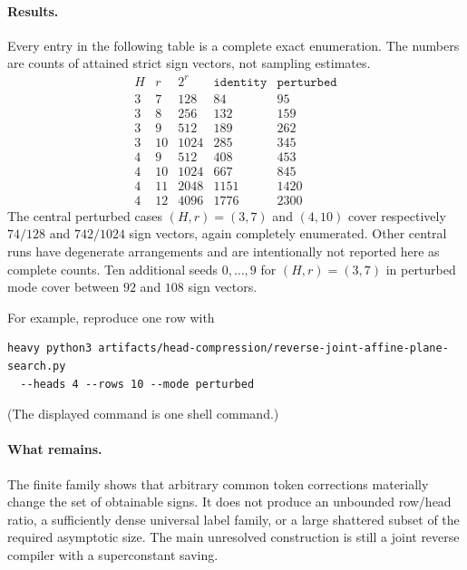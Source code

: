 \documentclass[11pt]{article}
\begin{document}
\paragraph{Results.}
Every entry in the following table is a complete exact enumeration.  The
numbers are counts of attained strict sign vectors, not sampling estimates.
\[
\begin{array}{c|r|r|r|r}
 H&r&2^r&\texttt{identity}&\texttt{perturbed}\\\hline
 3&7&128&84&95\\
 3&8&256&132&159\\
 3&9&512&189&262\\
 3&10&1024&285&345\\
 4&9&512&408&453\\
 4&10&1024&667&845\\
 4&11&2048&1151&1420\\
 4&12&4096&1776&2300
\end{array}
\]
The central perturbed cases $(H,r)=(3,7)$ and $(4,10)$ cover respectively
$74/128$ and $742/1024$ sign vectors, again completely enumerated.
Other central runs have degenerate arrangements and are intentionally not
reported here as complete counts.  Ten additional seeds $0,\ldots,9$ for
$(H,r)=(3,7)$ in perturbed mode cover between $92$ and $108$ sign vectors.

For example, reproduce one row with
\begin{verbatim}
heavy python3 artifacts/head-compression/reverse-joint-affine-plane-search.py 
  --heads 4 --rows 10 --mode perturbed
\end{verbatim}
(The displayed command is one shell command.)

\paragraph{What remains.}
The finite family shows that arbitrary common token corrections materially
change the set of obtainable signs.  It does not produce an unbounded
row/head ratio, a sufficiently dense universal label family, or a large
shattered subset of the required asymptotic size.  The main unresolved
construction is still a joint reverse compiler with a superconstant saving.
\end{document}
